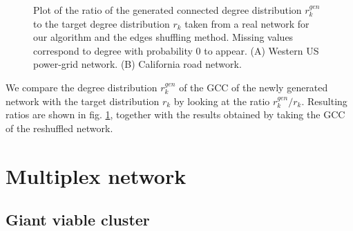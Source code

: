 \documentclass[
11pt, %
english, %
singlespacing, %
nolistspacing, %
liststotoc, %
headsepline, %
]{MastersDoctoralThesis} %
\begin{document}
\begin{figure}
	\hfill
	\caption{Plot of the ratio of the generated connected degree distribution $r^{gen}_k$ to the target degree distribution $r_k$ taken from a real network for our algorithm and the edges shuffling method. Missing values correspond to degree with probability $0$ to appear. (A) Western US power-grid network. (B) California road network.}
	\label{Figure: Real examples}
\end{figure}

We compare the degree distribution $r^{gen}_k$ of the GCC of the newly generated network with the target distribution $r_k$ by looking at the ratio $r^{gen}_k / r_k$. Resulting ratios are shown in fig. \ref{Figure: Real examples}, together with the results obtained by taking the GCC of the reshuffled network.


\chapter{Multiplex network}
\label{Section: Multiplex networks}

\section{Giant viable cluster}
\end{document}
